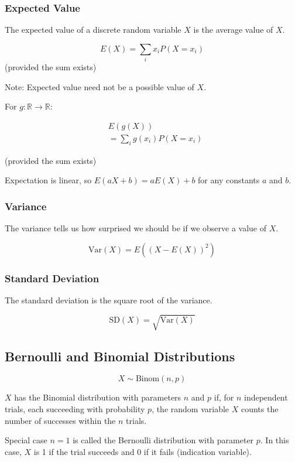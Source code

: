 \subsubsection*{Expected Value}

The expected value of a discrete random variable $X$ is the average value of $X$.

$$ E(X) = \sum_{i} x_i P(X = x_i) $$ (provided the sum exists)

Note: Expected value need not be a possible value of $X$.

For $g: \mathbb{R} \rightarrow \mathbb{R}$:

\begin{align*}
     & E(g(X))                      \\
     & = \sum_{i} g(x_i) P(X = x_i)
\end{align*}

(provided the sum exists)

Expectation is linear, so $E(aX + b) = aE(X) + b$ for any constants $a$ and $b$.

\subsubsection*{Variance}

The variance tells us how surprised we should be if we observe a value of $X$.

$$ \text{Var}(X) = E((X - E(X))^2) $$

\subsubsection*{Standard Deviation}

The standard deviation is the square root of the variance.

$$ \text{SD}(X) = \sqrt{\text{Var}(X)} $$

\subsection*{Bernoulli and Binomial Distributions}

$$X \sim \text{Binom}(n,p) $$

$X$ has the Binomial distribution with parameters $n$ and $p$ if, for $n$ independent trials, each succeeding with probability $p$, the random variable $X$ counts the number of successes within the $n$ trials.

Special case $n=1$ is called the Bernoulli distribution with parameter $p$. In this case, $X$ is 1 if the trial succeeds and 0 if it fails (indication variable).

